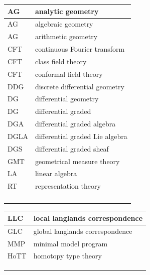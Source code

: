 \documentclass{amsart}
\numberwithin{equation}{section}
\theoremstyle{plain}
\numberwithin{equation}{section}
\theoremstyle{remark}
\begin{document}
\begin{longtable}{l|l}
\hline
AG & analytic geometry \\ \hline
AG & algebraic geometry \\ \hline
AG & arithmetic geometry \\ \hline
CFT  & continuous Fourier transform\\ \hline
CFT & class field theory\\ \hline
CFT & conformal field theory\\ \hline
DDG & discrete differential geometry\\ \hline
DG & differential geometry\\ \hline
DG & differential graded\\ \hline
DGA & differential graded algebra\\ \hline
DGLA & differential graded Lie algebra\\ \hline
DGS & differential graded sheaf\\ \hline
GMT  & geometrical measure theory\\ \hline
LA & linear algebra  \\ \hline
RT & representation theory\\ \hline
 & \\ \hline
 & \\ \hline
 & \\ \hline
 & \\ \hline
\end{longtable}

\begin{longtable}{l|l}
\hline
LLC & local langlands correspondence \\ \hline
GLC & global langlands correspondence  \\ \hline
MMP & minimal model program\\ \hline
HoTT & homotopy type theory\\ \hline
 & \\ \hline
 & \\ \hline
 & \\ \hline
\end{longtable}
\end{document}
